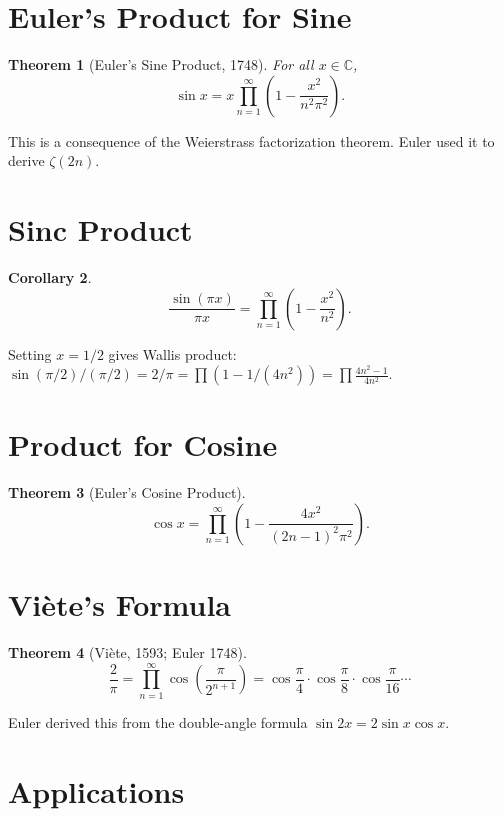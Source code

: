 \documentclass[11pt,a4paper,twoside]{book}
\theoremstyle{eulerstyle}
\newtheorem{theorem}{Theorem}[chapter]
\newtheorem{corollary}[theorem]{Corollary}
\theoremstyle{definition}
\newcommand{\C}{\mathbb{C}}
\begin{document}
\section{Euler's Product for Sine}

\begin{theorem}[Euler's Sine Product, 1748]
For all $x \in \C$,
\[
\sin x = x \prod_{n=1}^\infty \left(1 - \frac{x^2}{n^2 \pi^2}\right).
\]
\end{theorem}

This is a consequence of the Weierstrass factorization theorem. Euler used it to derive $\zeta(2n)$.

\section{Sinc Product}

\begin{corollary}
\[
\frac{\sin(\pi x)}{\pi x} = \prod_{n=1}^\infty \left(1 - \frac{x^2}{n^2}\right).
\]
\end{corollary}

Setting $x = 1/2$ gives Wallis product: $\sin(\pi/2)/(\pi/2) = 2/\pi = \prod (1 - 1/(4n^2)) = \prod \frac{4n^2-1}{4n^2}$.

\section{Product for Cosine}

\begin{theorem}[Euler's Cosine Product]
\[
\cos x = \prod_{n=1}^\infty \left(1 - \frac{4x^2}{(2n-1)^2 \pi^2}\right).
\]
\end{theorem}

\section{Viète's Formula}

\begin{theorem}[Viète, 1593; Euler 1748]
\[
\frac{2}{\pi} = \prod_{n=1}^\infty \cos\left(\frac{\pi}{2^{n+1}}\right)
= \cos\frac{\pi}{4} \cdot \cos\frac{\pi}{8} \cdot \cos\frac{\pi}{16} \cdots
\]
\end{theorem}

Euler derived this from the double-angle formula $\sin 2x = 2 \sin x \cos x$.

\section{Applications}
\end{document}
